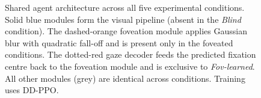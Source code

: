 \begin{figure}[t]
{%
}
\caption{Shared agent architecture across all five experimental conditions.
Solid blue modules form the visual pipeline (absent in the \emph{Blind} condition).
The dashed-orange foveation module applies Gaussian blur with quadratic fall-off
and is present only in the foveated conditions.
The dotted-red gaze decoder feeds the predicted fixation centre back to the
foveation module and is exclusive to \emph{Fov-learned}.
All other modules (grey) are identical across conditions.
Training uses DD-PPO.}
\label{fig:architecture}
\end{figure}
